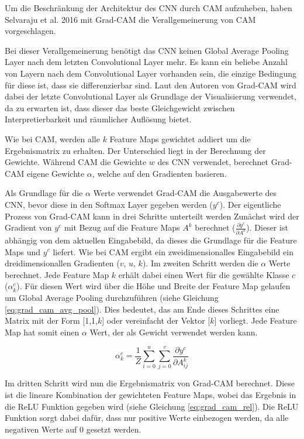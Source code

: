Um die Beschränkung der Architektur des \ac{CNN} durch \ac{CAM} aufzuheben, haben Selvaraju et al. 2016 mit Grad-\ac{CAM} die Verallgemeinerung von \ac{CAM} vorgeschlagen.

Bei dieser Verallgemeinerung benötigt das \ac{CNN} keinen Global Average Pooling Layer nach dem letzten Convolutional Layer mehr. Es kann ein beliebe Anzahl von Layern nach dem Convolutional Layer vorhanden sein, die einzige Bedingung für diese ist, dass sie differenzierbar sind. Laut den Autoren von Grad-\ac{CAM} wird dabei der letzte Convolutional Layer als Grundlage der Visualisierung verwendet, da zu erwarten ist, dass dieser das beste Gleichgewicht zwischen Interpretierbarkeit und räumlicher Auflösung bietet.

Wie bei \ac{CAM}, werden alle $k$ Feature Maps gewichtet addiert um die Ergebnismatrix zu erhalten. Der Unterschied liegt in der Berechnung der Gewichte. Während \ac{CAM} die Gewichte $w$ des \ac{CNN} verwendet, berechnet Grad-\ac{CAM} eigene Gewichte $\alpha$, welche auf den Gradienten basieren.

Als Grundlage für die $\alpha$ Werte verwendet Grad-\ac{CAM} die Ausgabewerte des \ac{CNN}, bevor diese in den Softmax Layer gegeben werden ($y^c$). Der eigentliche Prozess von Grad-\ac{CAM} kann in drei Schritte unterteilt werden Zunächst wird der Gradient von $y^c$ mit Bezug auf die Feature Maps $A^k$ berechnet ($\frac{\partial y^{c}}{\partial A^{k}}$). Dieser ist abhängig von dem aktuellen Eingabebild, da dieses die Grundlage für die Feature Maps und $y^c$ liefert. Wie bei \ac{CAM} ergibt ein zweidimensionalles Eingabebild ein dreidimensionallen Gradienten ($v$, $u$, $k$). Im zweiten Schritt werden die $\alpha$ Werte berechnet. Jede Feature Map $k$ erhält dabei einen Wert für die gewählte Klasse $c$ ($\alpha_{k}^{c}$). Für diesen Wert wird über die Höhe und Breite der Feature Map gelaufen um Global Average Pooling durchzuführen (siehe Gleichung \ref{eq:grad_cam_avg_pool}). Dies bedeutet, das am Ende dieses Schrittes eine Matrix mit der Form [1,1,$k$] oder vereinfacht der Vektor [$k$] vorliegt. Jede Feature Map hat somit einen $\alpha$ Wert, der als Gewicht verwendet werden kann. 

\begin{equation}
    \label{eq:grad_cam_avg_pool}
    \alpha_{k}^{c}={\frac{1}{Z} \sum_{i=0}^{u}\sum_{j=0}^{v}} \frac{\partial y^{c}}{\partial A_{i j}^{k}}
\end{equation}

Im dritten Schritt wird nun die Ergebnismatrix von Grad-\ac{CAM} berechnet. Diese ist die lineare Kombination der gewichteten Feature Maps, wobei das Ergebnis in die ReLU Funktion gegeben wird (siehe Gleichung \ref{eq:grad_cam_rel}).
Die ReLU Funktion sorgt dabei dafür, dass nur positive Werte einbezogen werden, da alle negativen Werte auf $0$ gesetzt werden.

